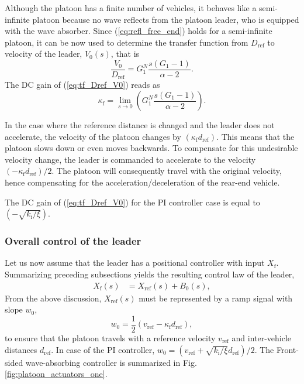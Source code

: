 \documentclass[final,5p,times,twocolumn]{elsarticle}
\begin{document}
Although the platoon has a finite number of vehicles, it behaves like a semi-infinite platoon because no wave reflects from the platoon leader, who is equipped with the wave absorber. Since (\ref{eq:refl_free_end}) holds for a semi-infinite platoon, it can be now used to determine the transfer function from $D_{\text{ref}}$ to velocity of the leader, $V_0(s)$, that is
\begin{equation}
  \frac{V_0}{D_{\text{ref}}} = G_1^N \frac{s(G_1-1)}{\alpha-2}.
  \label{eq:tf_Dref_V0}
\end{equation}
The DC gain of (\ref{eq:tf_Dref_V0}) reads as
\begin{equation}
   \kappa_{\text{f}} = \lim_{s\rightarrow 0} \left(G_1^N \frac{s(G_1-1)}{\alpha-2} \right).
\end{equation}

In the case where the reference distance is changed and the leader does not accelerate, the velocity of the platoon changes by $(\kappa_{\text{f}} d_{\text{ref}})$. This means that the platoon slows down or even moves backwards. To compensate for this undesirable velocity change, the leader is commanded to accelerate to the velocity
$(-\kappa_{\text{f}} d_{\text{ref}})/2$. The platoon will consequently travel with the original velocity, hence compensating for the acceleration/deceleration of the rear-end vehicle.

The DC gain of (\ref{eq:tf_Dref_V0}) for the PI controller case is equal to $(-\sqrt{k_{\text{i}}/\xi})$.


\subsubsection{Overall control of the leader}
Let us now assume that the leader has a positional controller with input $X_{\text{f}}$. Summarizing preceding subsections yields the resulting control law of the leader,
\begin{align}
X_{\text{f}}(s) &= X_{\text{ref}}(s) + B_0(s),
\label{eq:external_input_leader}
\end{align}
From the above discussion, $X_{\text{ref}}(s)$ must be represented by a ramp signal with slope $w_{0}$,
\begin{equation}
w_{0} = \frac{1}{2}\left(v_{\text{ref}}-\kappa_{\text{f}} d_{\text{ref}}\right),
\label{eq:ramp_leader}
\end{equation}
to ensure that the platoon travels with a reference velocity $v_{\text{ref}}$ and inter-vehicle distances $d_{\text{ref}}$. In case of the PI controller, $w_0 = \left(v_{\text{ref}} +\sqrt{k_{\text{i}}/\xi} d_{\text{ref}}\right)/2$. The Front-sided wave-absorbing controller is summarized in Fig. \ref{fig:platoon_actuators_one}.
\end{document}

